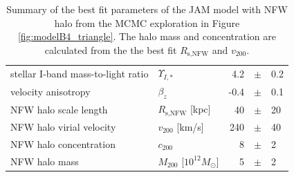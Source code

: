 \begin{table}
\centering
\begin{tabular}{llrcl}
\hline
stellar I-band mass-to-light ratio & $\Upsilon_{I,*}$ & 4.2 & $\pm$ & 0.2\\
velocity anisotropy & $\beta_z$ & -0.4 & $\pm$ & 0.1 \\
NFW halo scale length & $R_\text{s,NFW}$ [kpc] & 40 & $\pm$ & 20\\
NFW halo virial velocity & $v_{200}$ [km/s] & 240 & $\pm$ & 40\\
NFW halo concentration & $c_{200}$ & 8 & $\pm$ & 2 \\
NFW halo mass & $M_{200}$ [$10^{12} M_\odot$] & 5 & $\pm$ & 2\\
\hline
\end{tabular}
\caption{Summary of the best fit parameters of the JAM model with NFW halo from the MCMC exploration in Figure \ref{fig:modelB4_triangle}. The halo mass and concentration are calculated from the the best fit $R_\text{s,NFW}$ and $v_{200}$.}
\label{tab:modelB4_bestfit}
\end{table}

